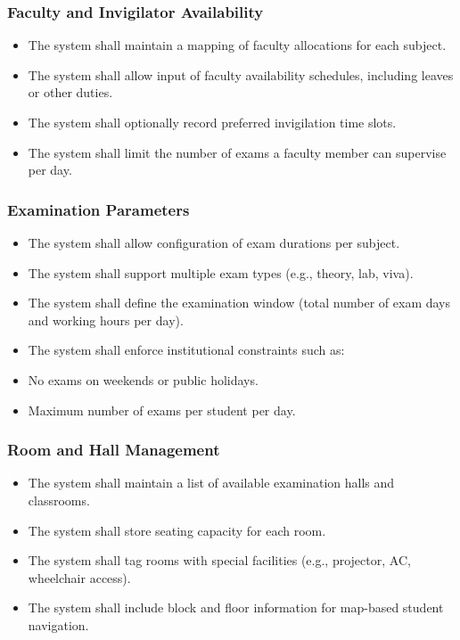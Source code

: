 \documentclass[a4paper,12pt]{article}
\begin{document}
\subsubsection{Faculty and Invigilator Availability}
\begin{itemize}
\item The system shall maintain a mapping of faculty allocations for each subject.

\item The system shall allow input of faculty availability schedules, including leaves or other duties.

\item The system shall optionally record preferred invigilation time slots.

\item The system shall limit the number of exams a faculty member can supervise per day.
\end{itemize}

\subsubsection{Examination Parameters}
\begin{itemize}
\item The system shall allow configuration of exam durations per subject.

\item The system shall support multiple exam types (e.g., theory, lab, viva).

\item The system shall define the examination window (total number of exam days and working hours per day).

\item The system shall enforce institutional constraints such as:

\item No exams on weekends or public holidays.

\item Maximum number of exams per student per day.
\end{itemize}

\subsubsection{Room and Hall Management}
\begin{itemize}
\item The system shall maintain a list of available examination halls and classrooms.

\item The system shall store seating capacity for each room.

\item The system shall tag rooms with special facilities (e.g., projector, AC, wheelchair access).

\item The system shall include block and floor information for map-based student navigation.
\end{itemize}
\end{document}
